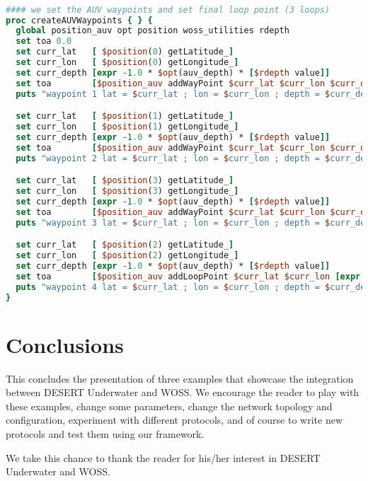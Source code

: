\documentclass[11pt]{article}
\begin{document}
{\scriptsize\tt
\begin{lstlisting}[language=tcl,showstringspaces=false]
#### we set the AUV waypoints and set final loop point (3 loops)
proc createAUVWaypoints { } {
  global position_auv opt position woss_utilities rdepth
  set toa 0.0
  set curr_lat   [ $position(0) getLatitude_]
  set curr_lon   [ $position(0) getLongitude_]
  set curr_depth [expr -1.0 * $opt(auv_depth) * [$rdepth value]]
  set toa        [$position_auv addWayPoint $curr_lat $curr_lon $curr_depth $opt(speed) 0.0 ]
  puts "waypoint 1 lat = $curr_lat ; lon = $curr_lon ; depth = $curr_depth; toa = $toa"

  set curr_lat   [ $position(1) getLatitude_]
  set curr_lon   [ $position(1) getLongitude_]
  set curr_depth [expr -1.0 * $opt(auv_depth) * [$rdepth value]]
  set toa        [$position_auv addWayPoint $curr_lat $curr_lon $curr_depth $opt(speed) 0.0 ]
  puts "waypoint 2 lat = $curr_lat ; lon = $curr_lon ; depth = $curr_depth; toa = $toa"

  set curr_lat   [ $position(3) getLatitude_]
  set curr_lon   [ $position(3) getLongitude_]
  set curr_depth [expr -1.0 * $opt(auv_depth) * [$rdepth value]]
  set toa        [$position_auv addWayPoint $curr_lat $curr_lon $curr_depth $opt(speed) 0.0 ]
  puts "waypoint 3 lat = $curr_lat ; lon = $curr_lon ; depth = $curr_depth; toa = $toa"

  set curr_lat   [ $position(2) getLatitude_]
  set curr_lon   [ $position(2) getLongitude_]
  set curr_depth [expr -1.0 * $opt(auv_depth) * [$rdepth value]]
  set toa        [$position_auv addLoopPoint $curr_lat $curr_lon [expr -1.0 * $opt(auv_depth)] $opt(speed) 0.0 0 4 ]
  puts "waypoint 4 lat = $curr_lat ; lon = $curr_lon ; depth = $curr_depth; toa = $toa"
}
\end{lstlisting}
}
\vspace{\baselinestretch\baselineskip}


\section{Conclusions}

\noindent This concludes the presentation of three examples that showcase the integration between DESERT Underwater and WOSS. 
We encourage the reader to play with these examples, change some parameters, change the network topology and configuration, experiment with different protocols, and of course to write new protocols and test them using our framework.

\noindent We take this chance to thank the reader for his/her interest in DESERT Underwater and WOSS.
\end{document}

